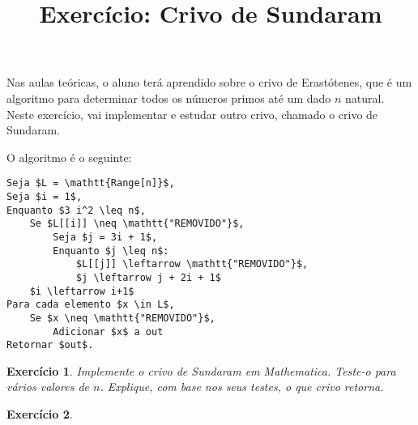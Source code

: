 \documentclass{article}
\title{Exercício: Crivo de Sundaram}
\author{}
\date{}
\newtheorem{ex}{Exercício}
\begin{document}
Nas aulas teóricas, o aluno terá aprendido sobre o crivo de Erastótenes, que é um algoritmo para determinar todos os números primos até um dado $n$ natural. Neste exercício, vai implementar e estudar outro crivo, chamado o crivo de Sundaram.

O algoritmo é o seguinte:
\begin{lstlisting}[columns=fullflexible]
Seja $L = \mathtt{Range[n]}$,
Seja $i = 1$,
Enquanto $3 i^2 \leq n$,
	Se $L[[i]] \neq \mathtt{"REMOVIDO"}$,
		Seja $j = 3i + 1$,
		Enquanto $j \leq n$:
			$L[[j]] \leftarrow \mathtt{"REMOVIDO"}$,
			$j \leftarrow j + 2i + 1$
	$i \leftarrow i+1$
Para cada elemento $x \in L$,
	Se $x \neq \mathtt{"REMOVIDO"}$,
		Adicionar $x$ a out
Retornar $out$.
\end{lstlisting}

\begin{ex}
Implemente o crivo de Sundaram em Mathematica. Teste-o para vários valores de $n$. Explique, com base nos seus testes, o que crivo retorna.
\end{ex}


\begin{ex}

\end{ex}
\end{document}
